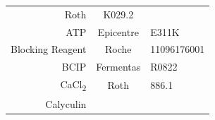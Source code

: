 \documentclass[11pt,singlespacinge,twoside]{reedthesis} %
\begin{document}
\begin{longtable}[]{@{}rcl@{}}
\begin{minipage}[t]{0.50\columnwidth}
Roth\strut
\end{minipage} & \begin{minipage}[t]{0.16\columnwidth}\raggedright
K029.2\strut
\end{minipage}\tabularnewline
\begin{minipage}[t]{0.26\columnwidth}\raggedleft
ATP\strut
\end{minipage} & \begin{minipage}[t]{0.50\columnwidth}\centering
Epicentre\strut
\end{minipage} & \begin{minipage}[t]{0.16\columnwidth}\raggedright
E311K\strut
\end{minipage}\tabularnewline
\begin{minipage}[t]{0.26\columnwidth}\raggedleft
Blocking Reagent\strut
\end{minipage} & \begin{minipage}[t]{0.50\columnwidth}\centering
Roche\strut
\end{minipage} & \begin{minipage}[t]{0.16\columnwidth}\raggedright
11096176001\strut
\end{minipage}\tabularnewline
\begin{minipage}[t]{0.26\columnwidth}\raggedleft
BCIP\strut
\end{minipage} & \begin{minipage}[t]{0.50\columnwidth}\centering
Fermentas\strut
\end{minipage} & \begin{minipage}[t]{0.16\columnwidth}\raggedright
R0822\strut
\end{minipage}\tabularnewline
\begin{minipage}[t]{0.26\columnwidth}\raggedleft
CaCl\textsubscript{2}\strut
\end{minipage} & \begin{minipage}[t]{0.50\columnwidth}\centering
Roth\strut
\end{minipage} & \begin{minipage}[t]{0.16\columnwidth}\raggedright
886.1\strut
\end{minipage}\tabularnewline
\begin{minipage}[t]{0.26\columnwidth}\raggedleft
Calyculin\strut
\end{minipage} & \begin{minipage}[t]{0.50\columnwidth}\centering
\strut
\end{minipage} & \begin{minipage}[t]{0.16\columnwidth}\raggedright

\end{minipage}
\end{longtable}
\end{document}
